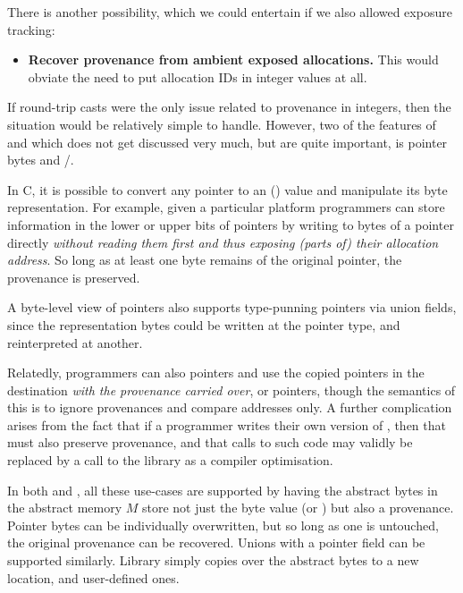 There is another possibility, which we could entertain if we also allowed
exposure tracking:
\begin{itemize}
    \item \textbf{Recover provenance from ambient exposed allocations.} This
        would obviate the need to put allocation IDs in integer values at all.
\end{itemize}

If round-trip casts were the only issue related to provenance in integers, then
the situation would be relatively simple to handle. However, two of the
features of  and  which does not get discussed very
much, but are quite important, is pointer bytes and
/.

In C, it is possible to convert any pointer to an ()
 value and manipulate its byte representation. For example,
given a particular platform programmers can store information in the lower or upper bits of
pointers by writing to bytes of a pointer directly
\emph{without reading them first and thus exposing (parts of) their allocation
address}. So long as at least one byte remains of the original pointer, the
provenance is preserved.

A byte-level view of pointers also supports type-punning pointers via union
fields, since the representation bytes could be written at the pointer type,
and reinterpreted at another.

Relatedly, programmers can also  pointers and use the copied
pointers in the destination \emph{with the provenance carried over}, or
 pointers, though the semantics of this is to ignore
provenances and compare addresses only. A further complication arises from the
fact that if a programmer writes their own version of , then
that must also preserve provenance, and that calls to such code may validly be
replaced by a call to the library  as a compiler
optimisation.

In both  and , all these use-cases are supported by
having the abstract bytes in the abstract memory $M$ store not just the
byte value (or ) but also a provenance. Pointer bytes
can be individually overwritten, but so long as one is untouched, the original
provenance can be recovered. Unions with a pointer field can be supported
similarly. Library  simply copies over the abstract bytes to a
new location, and user-defined ones.

